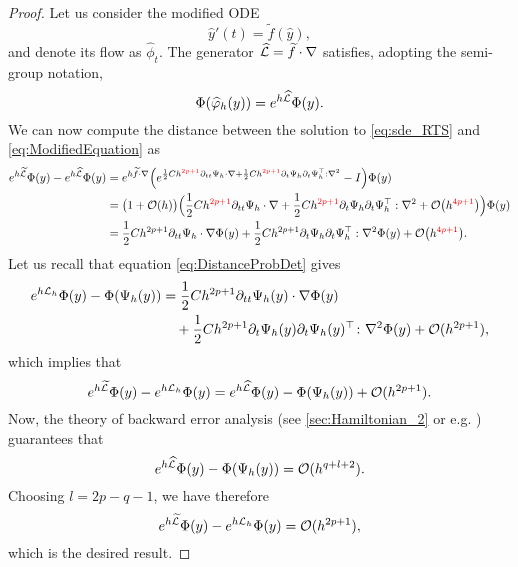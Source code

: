 \documentclass[10pt]{article}
\begin{document}
\begin{proof} Let us consider the modified ODE 
	\begin{equation}\label{eq:ModifiedEquation}
		\hat y'(t) = \tilde f(\hat y), 
	\end{equation}
	and denote its flow as $\hat \phi_t$. The generator $\widehat {\mathcal{L}} = \widetilde f \cdot \nabla$ satisfies, adopting the semi-group notation,
	\begin{equation}
		\Phi(\widehat {\varphi}_h(y)) = e^{h\widehat {\mathcal{L}}}\Phi(y).
	\end{equation} 
	We can now compute the distance between the solution to \eqref{eq:sde_RTS} and \eqref{eq:ModifiedEquation} as
	\begin{equation}
	\begin{aligned}
		e^{h \widetilde {\mathcal{L}}}\Phi(y)- e^{h \widehat {\mathcal{L}}}\Phi(y) &= e^{h\widetilde f \cdot \nabla}\Big(e^{\frac{1}{2}Ch^{{\color{red}2p+1}}\partial_{tt}\Psi_h \cdot \nabla + \frac{1}{2}Ch^{{\color{red}2p+1}}\partial_t \Psi_h \partial_t \Psi_h^\top : \nabla^2} - I\Big) \Phi(y)\\
		&= \big(1 + \mathcal{O}(h)\big)\Big(\frac{1}{2}Ch^{{\color{red}2p+1}}\partial_{tt}\Psi_h \cdot \nabla + \frac{1}{2}Ch^{{\color{red}2p+1}}\partial_t \Psi_h \partial_t \Psi_h^\top : \nabla^2 + \mathcal{O}\big(h^{{\color{red}4p+1}}\big)\Big)\Phi(y) \\
		&= \frac{1}{2}Ch^{2p+1}\partial_{tt}\Psi_h \cdot \nabla\Phi(y) + \frac{1}{2}Ch^{2p+1}\partial_t \Psi_h \partial_t \Psi_h^\top : \nabla^2 \Phi(y) + \mathcal{O}\big(h^{{\color{red}4p+1}}\big).
	\end{aligned}
	\end{equation}
	Let us recall that equation \eqref{eq:DistanceProbDet} gives
	\begin{equation}
	\begin{aligned}
		e^{h\mathcal{L}_h}\Phi(y) - \Phi(\Psi_h(y)) &= \frac{1}{2} Ch^{2p+1}\partial_{tt}\Psi_h(y) \cdot \nabla\Phi(y)\\
		&\quad +\frac{1}{2}Ch^{2p+1}\partial_t \Psi_h(y) \partial_t \Psi_h(y)^\top  \colon \nabla^2\Phi(y) + \mathcal{O}(h^{2p+1}),
	\end{aligned}
	\end{equation}
	which implies that
	\begin{equation}
		e^{h\widetilde {\mathcal{L}}}\Phi(y)- e^{h\mathcal{L}_h}\Phi(y) = e^{h\widehat {\mathcal{L}}}\Phi(y) - \Phi(\Psi_h(y)) + \mathcal{O}(h^{2p+1}).
	\end{equation}	
	Now, the theory of backward error analysis (see \cref{sec:Hamiltonian_2} or e.g. \cite[Chapter IX]{HLW06}) guarantees that
	\begin{equation}
		e^{h\widehat {\mathcal{L}}}\Phi(y) - \Phi(\Psi_h(y)) = \mathcal{O}(h^{q+l+2}).
	\end{equation}
	Choosing $l = 2p - q - 1$, we have therefore
	\begin{equation}
		e^{h\widetilde {\mathcal{L}}}\Phi(y)- e^{h\mathcal{L}_h}\Phi(y) = \mathcal{O}(h^{2p+1}),
	\end{equation}
	which is the desired result.
\end{proof}
\end{document}
